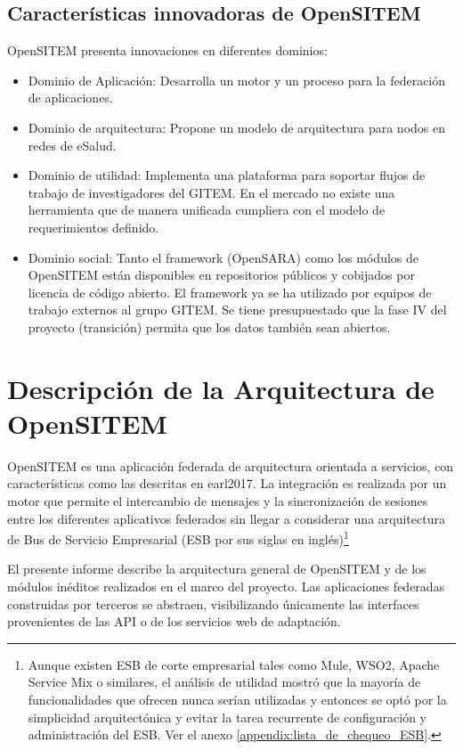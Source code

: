 \subsection{Características innovadoras de OpenSITEM}


OpenSITEM presenta innovaciones en diferentes dominios:

\begin{itemize}
 \item Dominio de Aplicación: Desarrolla un motor y un proceso para la federación de aplicaciones. 
 \item Dominio de arquitectura: Propone un modelo de arquitectura para nodos en redes de eSalud.
 \item Dominio de utilidad: Implementa una plataforma para soportar flujos de trabajo de investigadores del GITEM. En el mercado no existe una herramienta que de manera unificada cumpliera con el modelo de requerimientos definido.
 \item Dominio social: Tanto el framework (OpenSARA) como los módulos de OpenSITEM están disponibles en repositorios públicos y cobijados por licencia de código abierto. El framework ya se ha utilizado por equipos de trabajo externos al grupo GITEM. Se tiene presupuestado que la fase IV del proyecto (transición) permita que los datos también sean abiertos. 
\end{itemize}


\section{Descripción de la Arquitectura de OpenSITEM}

OpenSITEM es una aplicación federada de arquitectura orientada a servicios, con características como las descritas en {earl2017}. La integración es realizada por un motor que permite el intercambio de mensajes y la sincronización de sesiones entre los diferentes aplicativos federados sin llegar a considerar una arquitectura de Bus de Servicio Empresarial (ESB por sus siglas en inglés)\footnote{Aunque existen ESB de corte empresarial tales como Mule, WSO2, Apache Service Mix o similares, el análisis de utilidad mostró que la mayoría de funcionalidades que ofrecen nunca serían utilizadas y entonces se optó por la simplicidad arquitectónica y evitar la tarea recurrente de configuración y administración del ESB. Ver el anexo \ref{appendix:lista_de_chequeo_ESB}.} 

El presente informe describe la arquitectura general de OpenSITEM y de los módulos inéditos realizados en el marco del proyecto. Las aplicaciones federadas construidas por terceros se abstraen, visibilizando únicamente las interfaces provenientes de las API o de los servicios web de adaptación. 

